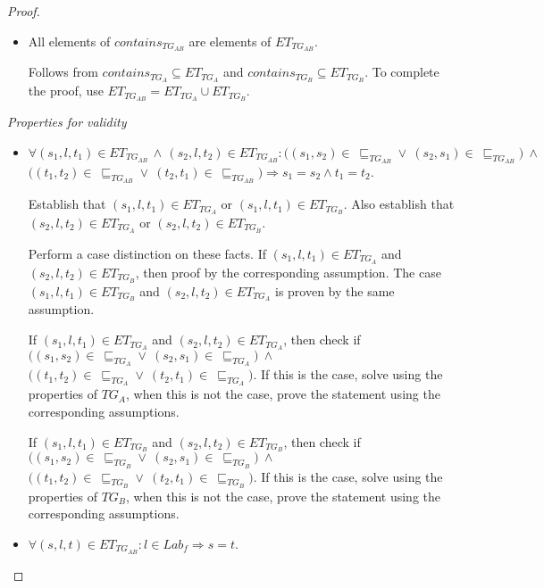 \begin{proof}
\begin{itemize}
\item All elements of $contains_{TG_{AB}}$ are elements of $ET_{TG_{AB}}$.

Follows from $contains_{TG_{A}} \subseteq ET_{TG_{A}}$ and $contains_{TG_{B}} \subseteq ET_{TG_{B}}$. To complete the proof, use $ET_{TG_{AB}} = ET_{TG_{A}} \cup ET_{TG_{B}}$.
\end{itemize}

\emph{Properties for validity}
\begin{itemize}
\item $\forall (s_1, l, t_1) \in ET_{TG_{AB}}\,\land\, (s_2, l, t_2) \in ET_{TG_{AB}}\!: \big((s_1, s_2) \in\ \sqsubseteq_{TG_{AB}} \lor\ (s_2, s_1) \in\ \sqsubseteq_{TG_{AB}}\!\!\big)\ \land$\\$\big((t_1, t_2) \in\ \sqsubseteq_{TG_{AB}} \lor\ (t_2, t_1) \in\ \sqsubseteq_{TG_{AB}}\!\!\big) \Longrightarrow s_1 = s_2 \land t_1 = t_2$.

Establish that $(s_1, l, t_1) \in ET_{TG_{A}}$ or $(s_1, l, t_1) \in ET_{TG_{B}}$. Also establish that $(s_2, l, t_2) \in ET_{TG_{A}}$ or $(s_2, l, t_2) \in ET_{TG_{B}}$.

Perform a case distinction on these facts. If $(s_1, l, t_1) \in ET_{TG_{A}}$ and $(s_2, l, t_2) \in ET_{TG_{B}}$, then proof by the corresponding assumption. The case $(s_1, l, t_1) \in ET_{TG_{B}}$ and $(s_2, l, t_2) \in ET_{TG_{A}}$ is proven by the same assumption.

If $(s_1, l, t_1) \in ET_{TG_{A}}$ and $(s_2, l, t_2) \in ET_{TG_{A}}$, then check if $\big((s_1, s_2) \in\ \sqsubseteq_{TG_{A}} \lor\ (s_2, s_1) \in\ \sqsubseteq_{TG_{A}}\!\!\big)\ \land$\\$\big((t_1, t_2) \in\ \sqsubseteq_{TG_{A}} \lor\ (t_2, t_1) \in\ \sqsubseteq_{TG_{A}}\!\!\big)$. If this is the case, solve using the properties of $TG_A$, when this is not the case, prove the statement using the corresponding assumptions.

If $(s_1, l, t_1) \in ET_{TG_{B}}$ and $(s_2, l, t_2) \in ET_{TG_{B}}$, then check if $\big((s_1, s_2) \in\ \sqsubseteq_{TG_{B}} \lor\ (s_2, s_1) \in\ \sqsubseteq_{TG_{B}}\!\!\big)\ \land$\\$\big((t_1, t_2) \in\ \sqsubseteq_{TG_{B}} \lor\ (t_2, t_1) \in\ \sqsubseteq_{TG_{B}}\!\!\big)$. If this is the case, solve using the properties of $TG_B$, when this is not the case, prove the statement using the corresponding assumptions.


\item $\forall (s, l, t) \in ET_{TG_{AB}}: l \in Lab_f \Longrightarrow s = t$.


\end{itemize}
\end{proof}

